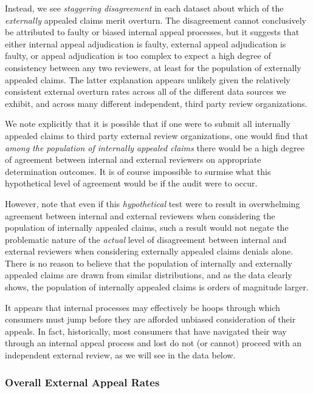 \documentclass[12pt, a4paper,twoside]{report}
\theoremstyle{plain} %
\theoremstyle{definition} %
\theoremstyle{remark} %
\numberwithin{equation}{chapter}
\begin{document}
		Instead, we see \emph{staggering disagreement} in each dataset about which of the \emph{externally} appealed claims merit overturn. The disagreement cannot conclusively be attributed to faulty or biased internal appeal processes, but it suggests that either internal appeal adjudication is faulty, external appeal adjudication is faulty, or appeal adjudication is too complex to expect a high degree of consistency between any two reviewers, at least for the population of externally appealed claims. The latter explanation appears unlikely given the relatively consistent external overturn rates across all of the different data sources we exhibit, and across many different independent, third party review organizations.
		
		We note explicitly that it is possible that if one were to submit all internally appealed claims to third party external review organizations, one would find that \emph{among the population of internally appealed claims} there would be a high degree of agreement between internal and external reviewers on appropriate determination outcomes. It is of course impossible to surmise what this hypothetical level of agreement would be if the audit were to occur.
		
		However, note that even if this \emph{hypothetical} test were to result in overwhelming agreement between internal and external reviewers when considering the population of internally appealed claims, such a result would not negate the problematic nature of the \emph{actual} level of disagreement between internal and external reviewers when considering externally appealed claims denials alone. There is no reason to believe that the population of internally and externally appealed claims are drawn from similar distributions, and as the data clearly shows, the population of internally appealed claims is orders of magnitude larger.
		
		It appears that internal processes may effectively be hoops through which consumers must jump before they are afforded unbiased consideration of their appeals. In fact, historically, most consumers that have navigated their way through an internal appeal process and lost do not (or cannot) proceed with an independent external review, as we will see in the data below.
		
		\subsubsection{Overall External Appeal Rates}
		
\end{document}
